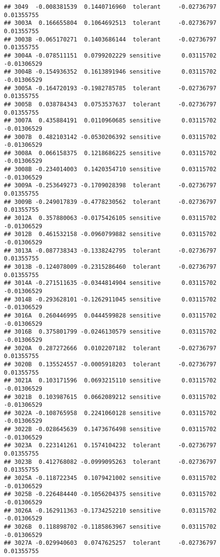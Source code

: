 \documentclass[
]{article}
\begin{document}
\begin{verbatim}
## 3049  -0.008381539  0.1440716960  tolerant     -0.02736797      0.01355755
## 3003A  0.166655804  0.1064692513  tolerant     -0.02736797      0.01355755
## 3003B -0.065170271  0.1403686144  tolerant     -0.02736797      0.01355755
## 3004A -0.078511151  0.0799202229 sensitive      0.03115702     -0.01306529
## 3004B -0.154936352  0.1613891946 sensitive      0.03115702     -0.01306529
## 3005A -0.164720193 -0.1982785785  tolerant     -0.02736797      0.01355755
## 3005B  0.038784343  0.0753537637  tolerant     -0.02736797      0.01355755
## 3007A  0.435884191  0.0110960685 sensitive      0.03115702     -0.01306529
## 3007B  0.482103142 -0.0530206392 sensitive      0.03115702     -0.01306529
## 3008A  0.066158375  0.1218686225 sensitive      0.03115702     -0.01306529
## 3008B -0.234014003  0.1420354710 sensitive      0.03115702     -0.01306529
## 3009A -0.253649273 -0.1709028398  tolerant     -0.02736797      0.01355755
## 3009B -0.249017839 -0.4778230562  tolerant     -0.02736797      0.01355755
## 3012A  0.357880063 -0.0175426105 sensitive      0.03115702     -0.01306529
## 3012B  0.461532158 -0.0960799882 sensitive      0.03115702     -0.01306529
## 3013A -0.087738343 -0.1338242795  tolerant     -0.02736797      0.01355755
## 3013B -0.124078009 -0.2315286460  tolerant     -0.02736797      0.01355755
## 3014A -0.271511635 -0.0344814904 sensitive      0.03115702     -0.01306529
## 3014B -0.293628101 -0.1262911045 sensitive      0.03115702     -0.01306529
## 3016A  0.260446995  0.0444599828 sensitive      0.03115702     -0.01306529
## 3016B  0.375801799 -0.0246130579 sensitive      0.03115702     -0.01306529
## 3020A  0.287272666  0.0102207182  tolerant     -0.02736797      0.01355755
## 3020B  0.135524557 -0.0005918203  tolerant     -0.02736797      0.01355755
## 3021A  0.103171596  0.0693215110 sensitive      0.03115702     -0.01306529
## 3021B  0.103987615  0.0662089212 sensitive      0.03115702     -0.01306529
## 3022A -0.108765958  0.2241060128 sensitive      0.03115702     -0.01306529
## 3022B -0.028645639  0.1473676498 sensitive      0.03115702     -0.01306529
## 3023A  0.223141261  0.1574104232  tolerant     -0.02736797      0.01355755
## 3023B  0.412768082 -0.0999095263  tolerant     -0.02736797      0.01355755
## 3025A -0.118722345  0.1079421002 sensitive      0.03115702     -0.01306529
## 3025B -0.226484440 -0.1056204375 sensitive      0.03115702     -0.01306529
## 3026A -0.162911363 -0.1734252210 sensitive      0.03115702     -0.01306529
## 3026B  0.118898702 -0.1185863967 sensitive      0.03115702     -0.01306529
## 3027A -0.029940603  0.0747625257  tolerant     -0.02736797      0.01355755

\end{verbatim}
\end{document}
